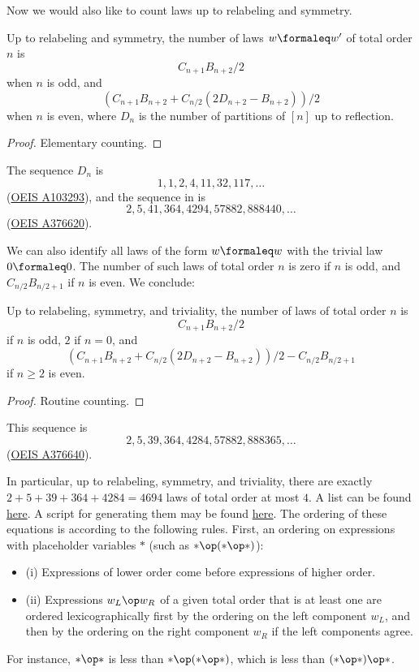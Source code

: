 Now we would also like to count laws up to relabeling and symmetry.

\begin{lemma}\label{law-count-sym}
  Up to relabeling and symmetry, the number of laws $w \formaleq w'$ of total order $n$ is
  $$ C_{n+1} B_{n+2}/2$$
  when $n$ is odd, and
  $$ (C_{n+1} B_{n+2} + C_{n/2} (2D_{n+2} - B_{n+2}))/2$$
  when $n$ is even, where $D_n$ is the number of partitions of $[n]$ up to reflection.
\end{lemma}

\begin{proof}
  Elementary counting.
\end{proof}

The sequence $D_n$ is
$$ 1, 1, 2, 4, 11, 32, 117, \dots$$
(\href{https://oeis.org/A103293}{OEIS A103293}), and the sequence in  is
$$ 2, 5, 41, 364, 4294, 57882, 888440, \dots$$
(\href{https://oeis.org/A376620}{OEIS A376620}).

We can also identify all laws of the form $w \formaleq w$ with the trivial law $0 \formaleq 0$. The number of such laws of total order $n$ is zero if $n$ is odd, and $C_{n/2} B_{n/2+1}$ if $n$ is even. We conclude:

\begin{lemma}\label{law-count-triv}
  Up to relabeling, symmetry, and triviality, the number of laws of total order $n$ is
  $$ C_{n+1} B_{n+2}/2$$
  if $n$ is odd, $2$ if $n = 0$, and
  $$ (C_{n+1} B_{n+2} + C_{n/2} (2D_{n+2} - B_{n+2}))/2 - C_{n/2} B_{n/2+1}$$
  if $n \geq 2$ is even.
\end{lemma}

\begin{proof}
  Routine counting.
\end{proof}

This sequence is
$$2, 5, 39, 364, 4284, 57882, 888365, \dots$$
(\href{https://oeis.org/A376640}{OEIS A376640}).

In particular, up to relabeling, symmetry, and triviality, there are exactly $2+5+39+364+4284=4694$ laws of total order at most $4$. A list can be found \href{https://github.com/teorth/equational_theories/blob/main/data/equations.txt}{here}. A script for generating them may be found \href{https://github.com/teorth/equational_theories/blob/main/scripts/generate_eqs_list.py}{here}. The ordering of these equations is according to the following rules.
First, an ordering on expressions with placeholder variables $\ast$ (such as $\ast \op (\ast \op \ast)$):
\begin{itemize}
\item (i)  Expressions of lower order come before expressions of higher order.
\item (ii) Expressions $w_L \op w_R$ of a given total order that is at least one are ordered lexicographically first by the ordering on the left component $w_L$, and then by the ordering on the right component $w_R$ if the left components agree.
\end{itemize}
For instance, $\ast \op \ast$ is less than $\ast \op (\ast \op \ast)$, which is less than $(\ast \op \ast) \op \ast$.

